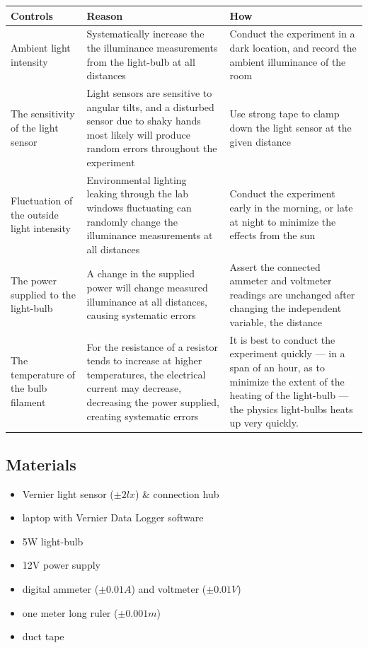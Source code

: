 \documentclass[a4paper,12pt]{article}
\begin{document}
\begin{longtable}{P{0.2\textwidth}|P{0.35\textwidth}|P{0.35\textwidth}}
Controls & Reason & How\\\hline
Ambient light intensity & Systematically increase the the illuminance measurements from the light-bulb at all distances & Conduct the experiment in a dark location, and record the ambient illuminance of the room \\

The sensitivity of the light sensor & Light sensors are sensitive to angular tilts, and a disturbed sensor due to shaky hands most likely will produce random errors throughout the experiment & Use strong tape to clamp down the light sensor at the given distance\\

Fluctuation of the outside light intensity & Environmental lighting leaking through the lab windows fluctuating can randomly change the illuminance measurements at all distances & Conduct the experiment early in the morning, or late at night to minimize the effects from the sun \\

The power supplied to the light-bulb & A change in the supplied power will change measured illuminance at all distances, causing systematic errors & Assert the connected ammeter and voltmeter readings are unchanged after changing the independent variable, the distance\\

The temperature of the bulb filament & For the resistance of a resistor tends to increase at higher temperatures, the electrical current may decrease, decreasing the power supplied, creating systematic errors & It is best to conduct the experiment quickly --- in a span of an hour, as to minimize the extent of the heating of the light-bulb --- the physics light-bulbs heats up very quickly.

\end{longtable}

\newpage

\subsection{Materials}
\begin{itemize}
 \item Vernier light sensor ($\pm 2\si{lx}$) \parencite{vernier_manual} \& connection hub
 \item laptop with Vernier Data Logger software
 \item 5W light-bulb
 \item 12V power supply
 \item digital ammeter ($\pm 0.01\si{A}$) and voltmeter ($\pm 0.01\si{V}$)
 \item one meter long ruler ($\pm 0.001\si{m}$)
 \item duct tape
 \end{itemize}
\end{document}
